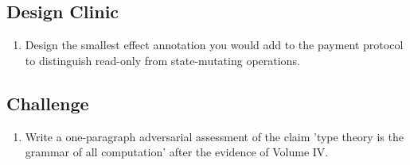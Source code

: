 \subsection*{Design Clinic}
\begin{enumerate}[label=\textbf{14.\arabic*},start=11]
\item Design the smallest effect annotation you would add to the payment protocol to distinguish read-only from state-mutating operations.
\end{enumerate}
\subsection*{Challenge}
\begin{enumerate}[label=\textbf{14.\arabic*},start=12]
\item Write a one-paragraph adversarial assessment of the claim 'type theory is the grammar of all computation' after the evidence of Volume IV.
\end{enumerate}
